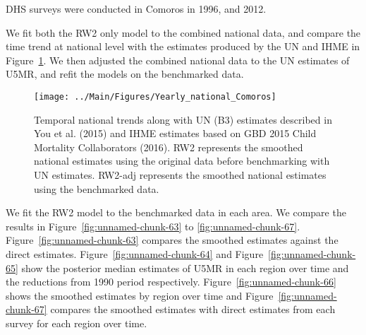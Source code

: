 \documentclass[12pt]{article}\usepackage[]{graphicx}\usepackage[]{color}
\newenvironment{knitrout}{}{} %
\begin{document}


DHS surveys were conducted in Comoros in 1996, and 2012.

We fit both the RW2 only model to the combined national data, and compare the time trend at national level with the estimates produced by the UN and IHME in Figure~\ref{fig:unnamed-chunk-62}. We then adjusted the combined national data to the UN estimates of U5MR, and refit the models on the benchmarked data. 

\begin{knitrout}
\color{fgcolor}\begin{figure}[bht]

{\centering \texttt{[image: ../Main/Figures/Yearly\_national\_Comoros]} 

}

\caption[Temporal national trends along with UN (B3) estimates described in You et al]{Temporal national trends along with UN (B3) estimates described in You et al. (2015) and IHME estimates based on GBD 2015 Child Mortality Collaborators (2016). RW2 represents the smoothed national estimates using the original data before benchmarking with UN estimates. RW2-adj represents the smoothed national estimates using the benchmarked data.}\label{fig:unnamed-chunk-62}
\end{figure}


\end{knitrout}
 

We fit the RW2 model to the benchmarked data in each area. 
We compare the results in Figure~\ref{fig:unnamed-chunk-63} to \ref{fig:unnamed-chunk-67}.
Figure~\ref{fig:unnamed-chunk-63} compares the smoothed estimates against the direct estimates. Figure~\ref{fig:unnamed-chunk-64} and Figure~\ref{fig:unnamed-chunk-65} show the posterior median estimates of U5MR in each region over time and the reductions from 1990 period respectively.
Figure~\ref{fig:unnamed-chunk-66} shows the smoothed estimates by region over time and Figure~\ref{fig:unnamed-chunk-67} compares the smoothed estimates with direct estimates from each survey for each region over time.


\end{document}
